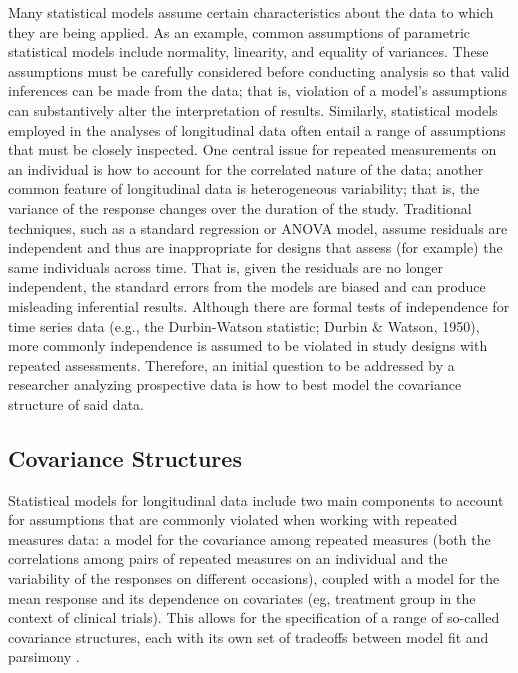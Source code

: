 \documentclass[
  10pt,
  letterpaper,
]{article}
\begin{document}
Many statistical models assume certain characteristics about the data to
which they are being applied. As an example, common assumptions of
parametric statistical models include normality, linearity, and equality
of variances. These assumptions must be carefully considered before
conducting analysis so that valid inferences can be made from the data;
that is, violation of a model's assumptions can substantively alter the
interpretation of results. Similarly, statistical models employed in the
analyses of longitudinal data often entail a range of assumptions that
must be closely inspected. One central issue for repeated measurements
on an individual is how to account for the correlated nature of the
data; another common feature of longitudinal data is heterogeneous
variability; that is, the variance of the response changes over the
duration of the study. Traditional techniques, such as a standard
regression or ANOVA model, assume residuals are independent and thus are
inappropriate for designs that assess (for example) the same individuals
across time. That is, given the residuals are no longer independent, the
standard errors from the models are biased and can produce misleading
inferential results. Although there are formal tests of independence for
time series data (e.g., the Durbin-Watson statistic; Durbin \& Watson,
1950), more commonly independence is assumed to be violated in study
designs with repeated assessments. Therefore, an initial question to be
addressed by a researcher analyzing prospective data is how to best
model the covariance structure of said data.

\hypertarget{covariance-structures}{%
\subsection{Covariance Structures}\label{covariance-structures}}

Statistical models for longitudinal data include two main components to
account for assumptions that are commonly violated when working with
repeated measures data: a model for the covariance among repeated
measures (both the correlations among pairs of repeated measures on an
individual and the variability of the responses on different occasions),
coupled with a model for the mean response and its dependence on
covariates (eg, treatment group in the context of clinical trials). This
allows for the specification of a range of so-called covariance
structures, each with its own set of tradeoffs between model fit and
parsimony \citep[e.g., see][]{kincaid2005}.
\end{document}
